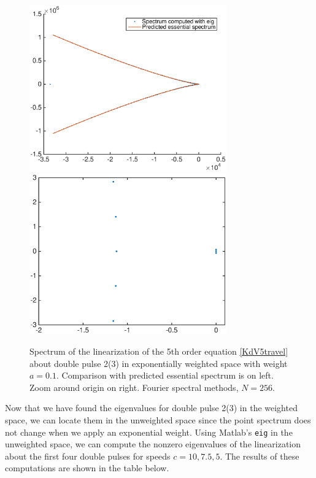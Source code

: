 \documentclass[12pt]{article}
\begin{document}
\begin{figure}[H]
	\includegraphics[width=8.5cm]{four10ud2_3expwt}
	\includegraphics[width=8.5cm]{four10ud2_3expwt2}
	\caption{Spectrum of the linearization of the 5th order equation \eqref{KdV5travel} about double pulse 2(3) in exponentially weighted space with weight $a = 0.1$. Comparison with predicted essential spectrum is on left. Zoom around origin on right. Fourier spectral methods, $N = 256$.}
\end{figure}

Now that we have found the eigenvalues for double pulse 2(3) in the weighted space, we can locate them in the unweighted space since the point spectrum does not change when we apply an exponential weight. Using Matlab's \texttt{eig} in the unweighted space, we can compute the nonzero eigenvalues of the linearization about the first four double pulses for speeds $c = 10, 7.5, 5$. The results of these computations are shown in the table below.
\end{document}
